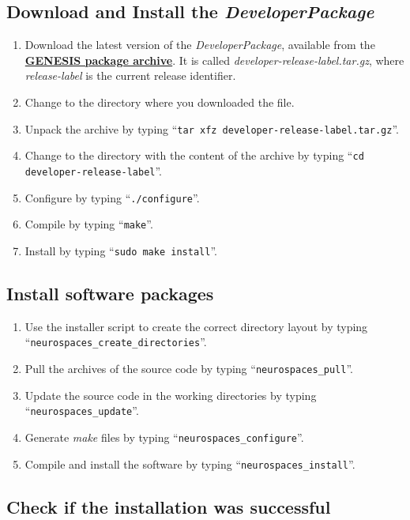 \documentclass[12pt]{article}
\begin{document}
\subsection*{Download and Install the {\it DeveloperPackage}}

\begin{enumerate}
   \item Download the latest version of the {\it DeveloperPackage}, available from the \href{http://repo-genesis3.cbi.utsa.edu/src/}{\bf GENESIS package archive}. It is called {\it developer-release-label.tar.gz}, where {\it release-label} is the current release identifier.
   \item Change to the directory where you downloaded the file.
   \item Unpack the archive by typing ``{\tt tar xfz developer-release-label.tar.gz}''.
   \item Change to the directory with the content of the archive by typing ``{\tt cd developer-release-label}''.
   \item Configure by typing ``{\tt ./configure}''.
   \item Compile by typing ``{\tt make}''.
   \item Install by typing ``{\tt sudo make install}''. 
\end{enumerate}

\subsection*{Install software packages}

\begin{enumerate}
   \item Use the installer script to create the correct directory layout by typing ``{\tt neurospaces\_create\_directories}''.
   \item Pull the archives of the source code by typing ``{\tt neurospaces\_pull}''.
   \item Update the source code in the working directories by typing ``{\tt neurospaces\_update}''.
   \item Generate {\it make} files by typing ``{\tt neurospaces\_configure}''.
   \item Compile and install the software by typing ``{\tt neurospaces\_install}''.
\end{enumerate}

\subsection*{Check if the installation was successful}
\end{document}
